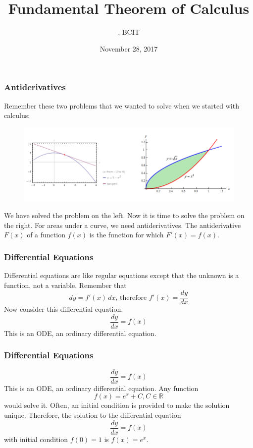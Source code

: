 \documentclass[xcolor=dvipsnames]{beamer}
\title{Fundamental Theorem of Calculus}
\subtitle{{\CourseNumber}, BCIT}
\author{\CourseName}
\date{November 28, 2017}
\begin{document}
\begin{frame}
  \titlepage
\end{frame}

\begin{frame}
  \frametitle{Antiderivatives}
Remember these two problems that we wanted to solve when we started
with calculus:
  \begin{figure}[h]
    \includegraphics[scale=.35]{./regiontangent.png}
  \end{figure}
We have solved the problem on the left. Now it is time to solve the
problem on the right. For areas under a curve, we need
antiderivatives. The antiderivative $F(x)$ of a function $f(x)$ is the
function for which $F'(x)=f(x)$. 
\end{frame}

\begin{frame}
  \frametitle{Differential Equations}
Differential equations are like regular equations except that the
unknown is a function, not a variable. Remember that
\begin{equation}
  \label{eq:aiceiphe}
  dy=f'(x)\,dx\mbox{, therefore }f'(x)=\frac{dy}{dx}
\end{equation}
Now consider this differential equation,
\begin{equation}
  \label{eq:pheiwaot}
  \frac{dy}{dx}=f(x)
\end{equation}
This is an ODE, an \alert{ordinary differential equation}. 
\end{frame}

\begin{frame}
  \frametitle{Differential Equations}
\begin{equation}
  \label{eq:ahngohto}
  \frac{dy}{dx}=f(x)
\end{equation}
This is an ODE, an \alert{ordinary differential equation}. Any
function
\begin{equation}
  \label{eq:ogheigha}
  f(x)=e^{x}+C,C\in\mathbb{R}
\end{equation}
would solve it. Often, an \alert{initial condition} is provided to
make the solution unique. Therefore, the solution to the differential
equation
\begin{equation}
  \label{eq:joogeipo}
  \frac{dy}{dx}=f(x)
\end{equation}
with initial condition $f(0)=1$ is $f(x)=e^{x}$.
\end{frame}
\end{document}
